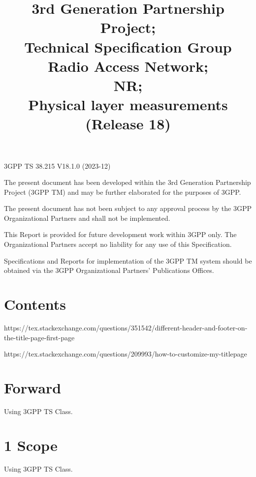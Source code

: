 \documentclass{3GPPspec}
\title{\begin{flushright}
		\textsf{
			3rd Generation Partnership Project;\\
			Technical Specification Group Radio Access Network;\\
			NR;\\
			Physical layer measurements\\
			(Release 18)
		}
	\end{flushright}
}
\begin{document}
\pagestyle{fancy}
\fancyhead[C]{\textsf{\thepage}}
\renewcommand{\headrulewidth}{0.4pt}



\thispagestyle{firstpage}

3GPP TS 38.215 V18.1.0 (2023-12)

\maketitle



The present document has been developed within the 3rd Generation Partnership Project (3GPP TM) and may be further elaborated for the purposes of 3GPP.

The present document has not been subject to any approval process by the 3GPP Organizational Partners and shall not be implemented.

This Report is provided for future development work within 3GPP only. The Organizational Partners accept no liability for any use of this Specification.

Specifications and Reports for implementation of the 3GPP TM system should be obtained via the 3GPP Organizational Partners' Publications Offices.

\newpage



\section*{\textsf{Contents}}
\tableofcontents

https://tex.stackexchange.com/questions/351542/different-header-and-footer-on-the-title-page-first-page

https://tex.stackexchange.com/questions/209993/how-to-customize-my-titlepage

\section*{\textsf{Forward}}
Using 3GPP TS Class.


\newpage
\section{\textsf{1 \quad Scope}}
Using 3GPP TS Class.
\end{document}
